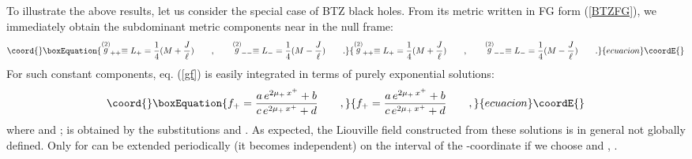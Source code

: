 \documentclass[a4paper,10pt]{article}
\begin{document}
To illustrate the above results, let us consider the special case of BTZ black 
holes. From its metric written in FG form (\ref{BTZFG}), 
we immediately obtain the subdominant metric 
components near \coordHE{} in the null frame:
\begin{equation}\coord{}\boxEquation{
\stackrel {(2)} g_{++}\equiv L_+= \frac 1 4 (M + \frac J \ell)  \qquad , \qquad
\stackrel {(2)} g_{--}\equiv L_-= \frac 1 4 (M - \frac J \ell)  
\qquad .
}{
\stackrel {(2)} g_{++}\equiv L_+= \frac 1 4 (M + \frac J \ell)  \qquad , \qquad
\stackrel {(2)} g_{--}\equiv L_-= \frac 1 4 (M - \frac J \ell)  
\qquad .
}{ecuacion}\coordE{}\end{equation}
For such constant components, eq. (\ref{gf}) is easily
integrated in terms of purely exponential solutions:
\begin{equation}\coord{}\boxEquation{
\label{f1}
f_+ = \frac  {a\, e^{2 \mu _+ \, x^+}+b}
             {c\, e^{2 \mu _+ \, x^+}+d}
\qquad  ,
}{
f_+ = \frac  {a\, e^{2 \mu _+ \, x^+}+b}
             {c\, e^{2 \mu _+ \, x^+}+d}
\qquad  ,
}{ecuacion}\coordE{}\end{equation}
where \coordHE{}
and \coordHE{};
\coordHE{}  is obtained by the substitutions \coordHE{}
and \coordHE{}.
As expected, the Liouville field constructed from these solutions
is in general not globally defined. 
Only for \coordHE{} can \myHighlight{$\phi$}\coordHE{} be extended periodically (it becomes
\myHighlight{$\varphi$}\coordHE{} independent)  on the interval
\myHighlight{$[0, 2 \pi]$}\coordHE{} of the \myHighlight{$\varphi$}\coordHE{}-coordinate if we choose \coordHE{} and
 \coordHE{}, \coordHE{}.
\end{document}
